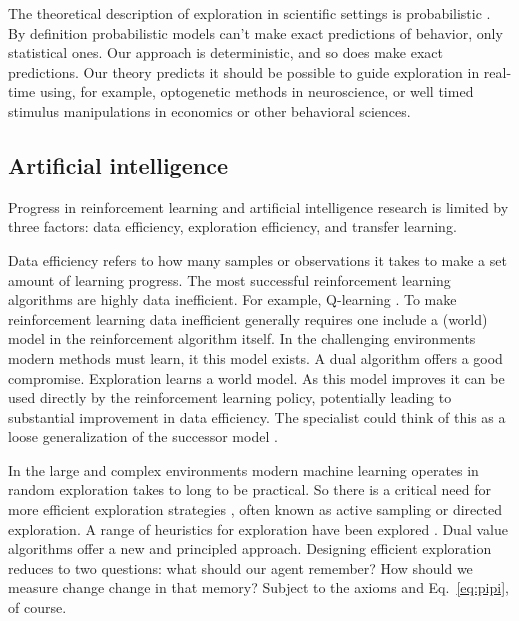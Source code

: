 The theoretical description of exploration in scientific settings is probabilistic \cite{Calhoun2014,Song2019a,Gershman2018b,Schulz2018a}. By definition probabilistic models can't make exact predictions of behavior, only statistical ones. Our approach is deterministic, and so does make exact predictions. Our theory predicts it should be possible to guide exploration in real-time using, for example, optogenetic methods in neuroscience, or well timed stimulus manipulations in economics or other behavioral sciences. 

\subsection*{Artificial intelligence}
Progress in reinforcement learning and artificial intelligence research is limited by three factors: data efficiency, exploration efficiency, and transfer learning.

Data efficiency refers to how many samples or observations it takes to make a set amount of learning progress. The most successful reinforcement learning algorithms are highly data inefficient. For example, Q-learning \cite{Mnih2015}. To make reinforcement learning data inefficient generally requires one include a (world) model in the reinforcement algorithm itself. In the challenging environments modern methods must learn, it this model exists. A dual algorithm offers a good compromise. Exploration learns a world model. As this model improves it can be used directly by the reinforcement learning policy, potentially leading to substantial improvement in data efficiency. The specialist could think of this as a loose generalization of the successor model \cite{Dayan1993,Kulkarni2016a,Ahilan2019}.

In the large and complex environments modern machine learning operates in random exploration takes to long to be practical. So there is a critical need for more efficient exploration strategies \cite{Ha2018}, often known as active sampling or directed exploration. A range of heuristics for exploration have been explored \cite{Gottlieb2018,Epshteyn2008,Thrun1992b,Ishii2002a,Bellemare2016,Haarnoja2018}. Dual value algorithms offer a new and principled approach. Designing efficient exploration reduces to two questions: what should our agent remember? How should we measure change change in that memory? Subject to the axioms and Eq.~\ref{eq:pipi}, of course.

